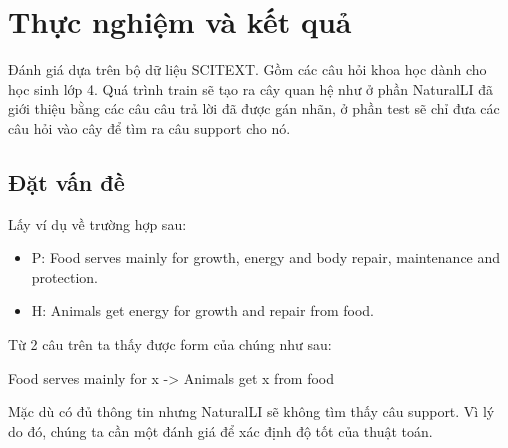 \documentclass[a4paper]{article}
\begin{document}
\section{Thực nghiệm và kết quả}

Đánh giá dựa trên bộ dữ liệu SCITEXT. Gồm các câu hỏi khoa học dành cho học sinh lớp 4. Quá trình train sẽ tạo ra cây quan hệ như ở phần NaturalLI đã giới thiệu bằng các câu câu trả lời đã được gán nhãn, ở phần test sẽ chỉ đưa các câu hỏi vào cây để tìm ra câu support cho nó.

\subsection*{Đặt vấn đề}
Lấy ví dụ về trường hợp sau:
\begin{itemize} 
\item[] P: Food serves mainly for growth, energy and body repair, maintenance and protection. 
\item[] H: Animals get energy for growth and repair from food. 
\end{itemize}
Từ 2 câu trên ta thấy được form của chúng như sau:

Food serves mainly for x -> Animals get x from food

Mặc dù có đủ thông tin nhưng NaturalLI sẽ không tìm thấy câu support. Vì lý do đó, chúng ta cần một đánh giá để xác định độ tốt của thuật toán.
\end{document}
